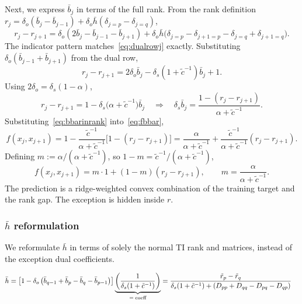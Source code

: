 \documentclass{article}
\theoremstyle{plain}
\begin{document}
Next, we express $\bar{b}_j$ in terms of the full rank. From the rank
definition $r_j = \delta_o(\bar{b}_j - \bar{b}_{j-1}) + \delta_o \bar{h}(\delta_{j=p} - \delta_{j=q})$,
\begin{equation}
r_j - r_{j+1} = \delta_o(2\bar{b}_j - \bar{b}_{j-1} - \bar{b}_{j+1})
+ \delta_o \bar{h}\bigl(\delta_{j=p} - \delta_{j+1=p} - \delta_{j=q} + \delta_{j+1=q}\bigr).
\end{equation}
The indicator pattern matches~\eqref{eq:dualrowj} exactly. Substituting
$\delta_o(\bar{b}_{j-1} + \bar{b}_{j+1})$ from the dual row,
\begin{equation}
r_j - r_{j+1} = 2\delta_o \bar{b}_j - \delta_s(1 + \tilde{c}^{-1})\bar{b}_j + 1.
\end{equation}
Using $2\delta_o = \delta_s(1-\alpha)$,
\begin{equation}
r_j - r_{j+1} = 1 - \delta_s\bigl(\alpha + \tilde{c}^{-1}\bigr)\bar{b}_j
\quad\Longrightarrow\quad
\delta_s \bar{b}_j = \frac{1 - (r_j - r_{j+1})}{\alpha + \tilde{c}^{-1}}.
\label{eq:bbarinrank}
\end{equation}
Substituting~\eqref{eq:bbarinrank} into~\eqref{eq:fbbar},
\begin{equation}
f(x_j, x_{j+1}) = 1 - \frac{\tilde{c}^{-1}}{\alpha + \tilde{c}^{-1}}
\bigl[1 - (r_j - r_{j+1})\bigr]
= \frac{\alpha}{\alpha + \tilde{c}^{-1}} + \frac{\tilde{c}^{-1}}{\alpha + \tilde{c}^{-1}}(r_j - r_{j+1}).
\end{equation}
Defining $m := \alpha/(\alpha + \tilde{c}^{-1})$, so $1 - m = \tilde{c}^{-1}/(\alpha + \tilde{c}^{-1})$,
\begin{equation}
\boxed{\,f(x_j, x_{j+1}) = m \cdot 1 + (1-m)(r_j - r_{j+1}),\qquad
m = \frac{\alpha}{\alpha + \tilde{c}^{-1}}.\,}
\end{equation}
The prediction is a ridge-weighted convex combination of the training target
and the rank gap. The exception is hidden inside $r$.

\subsubsection*{$\bar{h}$ reformulation}

We reformulate $\bar{h}$ in terms of solely the normal TI rank and matrices, instead of the exception dual coefficients.

\begin{align*}
\bar{h} &= \left[ 1 - \delta_o \left( \bar{b}_{q-1} + \bar{b}_p - \bar{b}_q - \bar{b}_{p-1} \right) \right] 
\underbrace{\left( \frac{1}{\delta_s (1 + \tilde{c}^{-1})} \right)}_{=\;\text{coeff}}
= \frac{\tilde{r}_p - \tilde{r}_q}{\delta_s (1 + \tilde{c}^{-1}) 
     + (D_{pp} + D_{qq} - D_{pq} - D_{qp})} \notag
\end{align*}
\end{document}
